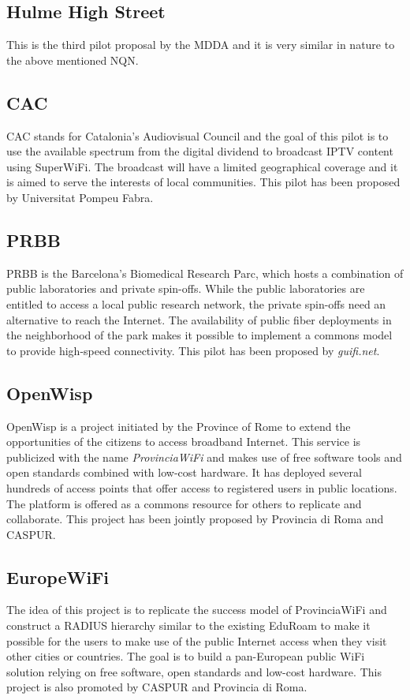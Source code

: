 \documentclass[conference]{IEEEtran}
\begin{document}
\subsection{Hulme High Street}
This is the third pilot proposal by the MDDA and it is very similar in nature to the above mentioned NQN.

\subsection{CAC}
CAC stands for Catalonia's Audiovisual Council and the goal of this pilot is to use the available spectrum from the digital dividend to broadcast IPTV content using SuperWiFi.
The broadcast will have a limited geographical coverage and it is aimed to serve the interests of local communities.
This pilot has been proposed by Universitat Pompeu Fabra.

\subsection{PRBB}
PRBB is the Barcelona's Biomedical Research Parc, which hosts a combination of public laboratories and private spin-offs.
While the public laboratories are entitled to access a local public research network, the private spin-offs need an alternative to reach the Internet.
The availability of public fiber deployments in the neighborhood of the park makes it possible to implement a commons model to provide high-speed connectivity.
This pilot has been proposed by \emph{guifi.net}.

\subsection{OpenWisp}
OpenWisp is a project initiated by the Province of Rome to extend the opportunities of the citizens to access broadband Internet.
This service is publicized with the name \emph{ProvinciaWiFi} and makes use of free software tools and open standards combined with low-cost hardware.
It has deployed several hundreds of access points that offer access to registered users in public locations.
The platform is offered as a commons resource for others to replicate and collaborate.
This project has been jointly proposed by Provincia di Roma and CASPUR.

\subsection{EuropeWiFi}
The idea of this project is to replicate the success model of ProvinciaWiFi and construct a RADIUS hierarchy similar to the existing EduRoam to make it possible for the users to make use of the public Internet access when they visit other cities or countries.
The goal is to build a pan-European public WiFi solution relying on free software, open standards and low-cost hardware.
This project is also promoted by CASPUR and Provincia di Roma.
\end{document}
